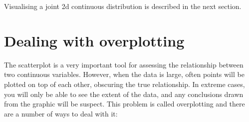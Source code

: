 Visualising a joint 2d continuous distribution is described in the next section.

\section{Dealing with overplotting}
\label{sec:overplotting}

The scatterplot is a very important tool for assessing the relationship between two continuous variables.  However, when the data is large, often points will be plotted on top of each other, obscuring the true relationship.  In extreme cases, you will only be able to see the extent of the data, and any conclusions drawn from the graphic will be suspect.  This problem is called overplotting and there are a number of ways to deal with it: 

